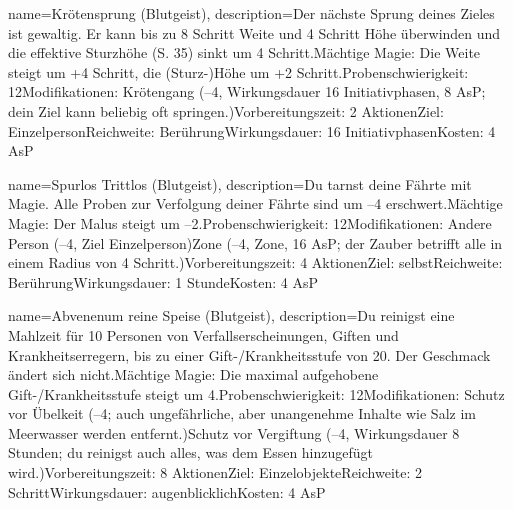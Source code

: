 {
    name={Krötensprung (Blutgeist)},
    description={Der nächste Sprung deines Zieles ist gewaltig. Er kann bis zu 8 Schritt Weite und 4 Schritt Höhe überwinden und die effektive Sturzhöhe (S. 35) sinkt um 4 Schritt.\newline Mächtige Magie: Die Weite steigt um +4 Schritt,  die (Sturz-)Höhe um +2 Schritt.\newline Probenschwierigkeit: 12\newline Modifikationen: Krötengang (–4, Wirkungsdauer 16 Initiativphasen, 8 AsP; dein Ziel kann beliebig oft springen.)\newline Vorbereitungszeit: 2 Aktionen\newline Ziel: Einzelperson\newline Reichweite: Berührung\newline Wirkungsdauer: 16 Initiativphasen\newline Kosten: 4 AsP}
}


{
    name={Spurlos Trittlos (Blutgeist)},
    description={Du tarnst deine Fährte mit Magie. Alle Proben zur Verfolgung deiner Fährte sind um –4 erschwert.\newline Mächtige Magie: Der Malus steigt um –2.\newline Probenschwierigkeit: 12\newline Modifikationen: Andere Person (–4, Ziel Einzelperson)\newline Zone (–4, Zone, 16 AsP; der Zauber betrifft alle in einem Radius von 4 Schritt.)\newline Vorbereitungszeit: 4 Aktionen\newline Ziel: selbst\newline Reichweite: Berührung\newline Wirkungsdauer: 1 Stunde\newline Kosten: 4 AsP}
}


{
    name={Abvenenum reine Speise (Blutgeist)},
    description={Du reinigst eine Mahlzeit für 10 Personen von Verfallserscheinungen, Giften und Krankheitserregern, bis zu einer Gift-/Krankheitsstufe von 20. Der Geschmack ändert sich nicht.\newline Mächtige Magie: Die maximal aufgehobene Gift-/Krankheitsstufe steigt um 4.\newline Probenschwierigkeit: 12\newline Modifikationen: Schutz vor Übelkeit (–4; auch ungefährliche, aber unangenehme Inhalte wie Salz im Meerwasser werden entfernt.)\newline Schutz vor Vergiftung (–4, Wirkungsdauer 8 Stunden; du reinigst auch alles, was dem Essen hinzugefügt wird.)\newline Vorbereitungszeit: 8 Aktionen\newline Ziel: Einzelobjekte\newline Reichweite: 2 Schritt\newline Wirkungsdauer: augenblicklich\newline Kosten: 4 AsP}
}


